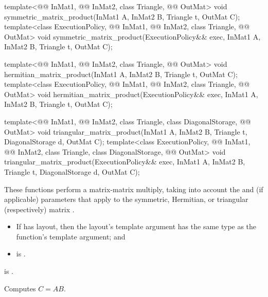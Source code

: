 %
\begin{itemdecl}
  template<@@ InMat1, @@ InMat2, class Triangle, @@ OutMat>
    void symmetric_matrix_product(InMat1 A, InMat2 B, Triangle t, OutMat C);
  template<class ExecutionPolicy,
           @@ InMat1, @@ InMat2, class Triangle, @@ OutMat>
    void symmetric_matrix_product(ExecutionPolicy&& exec,
                                  InMat1 A, InMat2 B, Triangle t, OutMat C);

  template<@@ InMat1, @@ InMat2, class Triangle, @@ OutMat>
    void hermitian_matrix_product(InMat1 A, InMat2 B, Triangle t, OutMat C);
  template<class ExecutionPolicy,
           @@ InMat1, @@ InMat2, class Triangle, @@ OutMat>
    void hermitian_matrix_product(ExecutionPolicy&& exec,
                                  InMat1 A, InMat2 B, Triangle t, OutMat C);

  template<@@ InMat1, @@ InMat2, class Triangle, class DiagonalStorage,
           @@ OutMat>
    void triangular_matrix_product(InMat1 A, InMat2 B, Triangle t, DiagonalStorage d, OutMat C);
  template<class ExecutionPolicy,
           @@ InMat1, @@ InMat2, class Triangle, class DiagonalStorage,
           @@ OutMat>
    void triangular_matrix_product(ExecutionPolicy&& exec,
                                   InMat1 A, InMat2 B, Triangle t, DiagonalStorage d, OutMat C);
\end{itemdecl}

\begin{itemdescr}
\pnum
These functions perform a matrix-matrix multiply,
taking into account
the  and  (if applicable) parameters
that apply to the symmetric, Hermitian, or triangular (respectively) matrix .

\pnum
\mandates
\begin{itemize}
\item
If  has  layout,
then the layout's  template argument has
the same type as the function's  template argument; and
\item
{} is .
\end{itemize}

\pnum
\expects
{} is .

\pnum
\effects
Computes $C = A B$.
\end{itemdescr}

